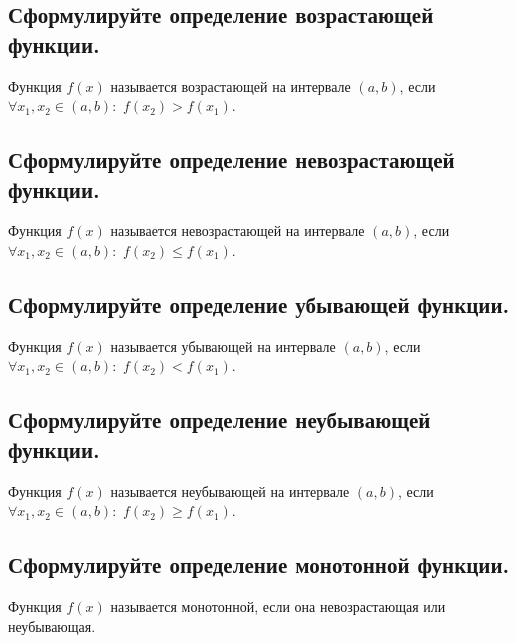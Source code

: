 \subsection{Сформулируйте определение возрастающей функции.}

Функция $f(x)$ называется возрастающей на интервале $(a, b)$, если $\forall x_1, x_2 \in (a, b):$ $f(x_2)>f(x_1)$.



\subsection{Сформулируйте определение невозрастающей функции.}

Функция $f(x)$ называется невозрастающей на интервале $(a, b)$, если $\forall x_1, x_2 \in (a, b):$ $f(x_2) \leqslant f(x_1)$.


\subsection{Сформулируйте определение убывающей функции.}

Функция $f(x)$ называется убывающей на интервале $(a, b)$, если $\forall x_1, x_2 \in (a, b):$ $f(x_2)<f(x_1)$.



\subsection{Сформулируйте определение неубывающей функции.}

Функция $f(x)$ называется неубывающей на интервале $(a, b)$, если $\forall x_1, x_2 \in (a, b):$ $f(x_2) \geqslant f(x_1)$.



\subsection{Сформулируйте определение монотонной функции.}

Функция $f(x)$ называется монотонной, если она невозрастающая или неубывающая.



